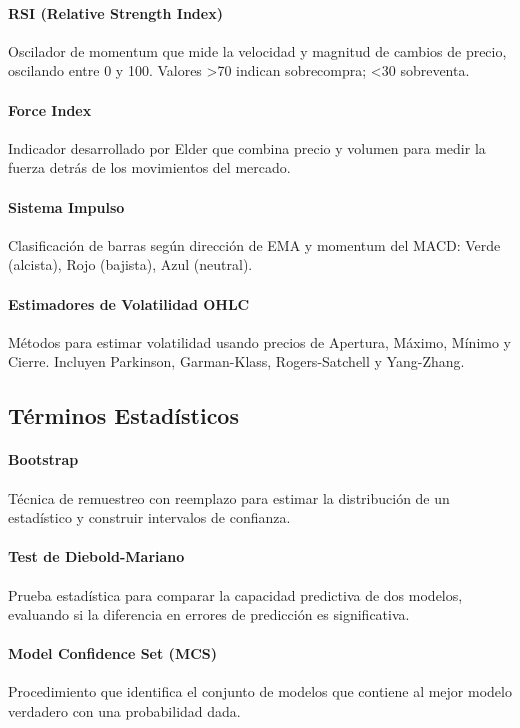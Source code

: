 \documentclass[11pt,a4paper]{article}
\begin{document}
\paragraph{RSI (Relative Strength Index)} \label{glos:rsi}
Oscilador de momentum que mide la velocidad y magnitud de cambios de precio, oscilando entre 0 y 100. Valores >70 indican sobrecompra; <30 sobreventa.

\paragraph{Force Index} \label{glos:force-index}
Indicador desarrollado por Elder que combina precio y volumen para medir la fuerza detrás de los movimientos del mercado.

\paragraph{Sistema Impulso} \label{glos:impulso}
Clasificación de barras según dirección de EMA y momentum del MACD: Verde (alcista), Rojo (bajista), Azul (neutral).

\paragraph{Estimadores de Volatilidad OHLC} \label{glos:ohlc}
Métodos para estimar volatilidad usando precios de Apertura, Máximo, Mínimo y Cierre. Incluyen Parkinson, Garman-Klass, Rogers-Satchell y Yang-Zhang.

\subsection*{Términos Estadísticos}

\paragraph{Bootstrap} \label{glos:bootstrap}
Técnica de remuestreo con reemplazo para estimar la distribución de un estadístico y construir intervalos de confianza.

\paragraph{Test de Diebold-Mariano} \label{glos:diebold-mariano}
Prueba estadística para comparar la capacidad predictiva de dos modelos, evaluando si la diferencia en errores de predicción es significativa.

\paragraph{Model Confidence Set (MCS)} \label{glos:mcs}
Procedimiento que identifica el conjunto de modelos que contiene al mejor modelo verdadero con una probabilidad dada.
\end{document}
